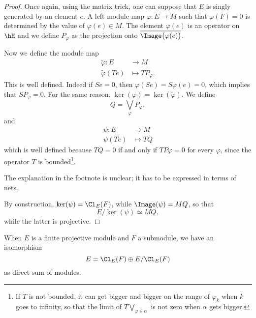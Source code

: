 \begin{proof}
Once again, using the matrix trick, one can suppose that $E$ is singly generated by an element $e$. A left module map $\varphi\colon E\to M$ such that $\varphi(F)=0$ is determined by the value of $\varphi(e)\in M$. The element $\varphi(e)$ is an operator on $\hH$ and we define $P_{\varphi}$ as the projection onto $\overline{ \Image\big( \varphi(e) \big) }$.

Now we define the module map
\begin{equation}
\begin{aligned}
\tilde{\varphi} \colon E&\to M \\
   \tilde{\varphi}(Te)&\mapsto TP_{\varphi}.
\end{aligned}
\end{equation}
This is well defined. Indeed if $Se=0$, then $\varphi(Se)=S\varphi(e)=0$, which implies that $SP_{\varphi}=0$. For the same reason, $\ker(\varphi)=\ker(\tilde{\varphi})$. We define
\begin{equation}
	Q=\bigvee_{\varphi}P_{\varphi},
\end{equation}
and
\begin{equation}
\begin{aligned}
 \psi\colon E&\to M \\
   \psi(Te)&\mapsto TQ
\end{aligned}
\end{equation}
which is well defined because $TQ=0$ if and only if $TP\varphi =0$ for every $\varphi$, since the operator $T$ is bounded\footnote{If $T$ is not bounded, it can get bigger and bigger on the range of $\varphi_k$ when $k$ goes to infinity, so that the limit of $T\bigvee_{\varphi\in\alpha}$ is not zero when $\alpha$ gets bigger.}.
\begin{probleme}
The explanation in the footnote is unclear; it has to be expressed in terms of nets.
\end{probleme}
By construction, $\ker(\psi)=\Cl_E(F)$, while $\Image(\psi)=MQ$, so that
\begin{equation}
	E/\ker(\psi)\simeq MQ,
\end{equation}
while the latter is projective.
\end{proof}

\begin{corollary}		\label{CorEfgpFssIsom}
When $E$ is a finite projective module and $F$ a submodule, we have an isomorphism
\[
	E=\Cl_E(F)\oplus E/\Cl_E(F)
\]
as direct sum of modules.
\end{corollary}

